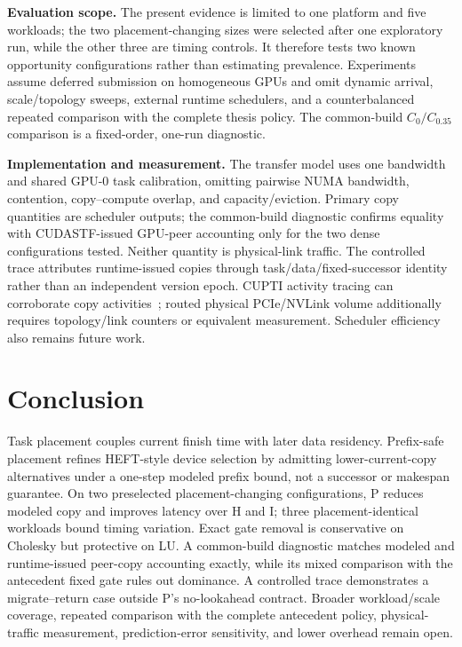 \documentclass[sigconf]{acmart}
\begin{document}
\textbf{Evaluation scope.} The present evidence is limited to one platform and five workloads; the two placement-changing sizes were selected after one exploratory run, while the other three are timing controls. It therefore tests two known opportunity configurations rather than estimating prevalence. Experiments assume deferred submission on homogeneous GPUs and omit dynamic arrival, scale/topology sweeps, external runtime schedulers, and a counterbalanced repeated comparison with the complete thesis policy. The common-build \(C_0/C_{0.35}\) comparison is a fixed-order, one-run diagnostic.

\textbf{Implementation and measurement.} The transfer model uses one bandwidth and shared GPU-0 task calibration, omitting pairwise NUMA bandwidth, contention, copy--compute overlap, and capacity/eviction. Primary copy quantities are scheduler outputs; the common-build diagnostic confirms equality with CUDASTF-issued GPU-peer accounting only for the two dense configurations tested. Neither quantity is physical-link traffic. The controlled trace attributes runtime-issued copies through task/data/fixed-successor identity rather than an independent version epoch. CUPTI activity tracing can corroborate copy activities~\citep{nvidia2026cupti}; routed physical PCIe/NVLink volume additionally requires topology/link counters or equivalent measurement. Scheduler efficiency also remains future work.

\section{Conclusion}\label{sec:conclusion}

Task placement couples current finish time with later data residency. Prefix-safe placement refines HEFT-style device selection by admitting lower-current-copy alternatives under a one-step modeled prefix bound, not a successor or makespan guarantee. On two preselected placement-changing configurations, P reduces modeled copy and improves latency over H and I; three placement-identical workloads bound timing variation. Exact gate removal is conservative on Cholesky but protective on LU. A common-build diagnostic matches modeled and runtime-issued peer-copy accounting exactly, while its mixed comparison with the antecedent fixed gate rules out dominance. A controlled trace demonstrates a migrate--return case outside P's no-lookahead contract. Broader workload/scale coverage, repeated comparison with the complete antecedent policy, physical-traffic measurement, prediction-error sensitivity, and lower overhead remain open.



\end{document}
